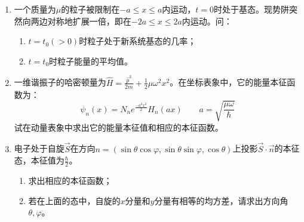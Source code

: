 
\begin{enumerate}
	\item
一个质量为$\mu$的粒子被限制在$-a\le x\le a$内运动，$t=0$时处于基态。现势阱突然向两边对称地扩展一倍，即在$-2a\le x\le 2a$内运动。问：
\begin{enumerate}
	\item
	$t=t_0(>0)$时粒子处于新系统基态的几率；
\item 
$t=t_0$时粒子能量的平均值。
\end{enumerate}

\banswer{
	
}


\item 
一维谐振子的哈密顿量为$\hat{H}=\frac{\hat{p}^2}{2m}+\frac{1}{2}\mu\omega^2x^2$。在坐标表象中，它的能量本征函数为：
$$\psi_n(x)=N_ne^{\frac{-a^2x^2}{2}}H_n(ax)\qquad a=\sqrt{\frac{\mu\omega}{\hbar}}$$
试在动量表象中求出它的能量本征值和相应的本征函数。

\banswer{
	
}


\item 
电子处于自旋$\vec{S}$在方向$n=(\sin\theta\cos\varphi,\sin\theta\sin\varphi,\cos\theta)$上投影$\vec{S}\cdot\vec{n}$的本征态，本征值为$\frac{\hbar}{2}$。
\begin{enumerate}
	\item
求出相应的本征函数；

\item 
若在上面的态中，自旋的$x$分量和$y$分量有相等的均方差，请求出方向角$\theta,\varphi$。
\end{enumerate}


\banswer{
	
}
\end{enumerate}
